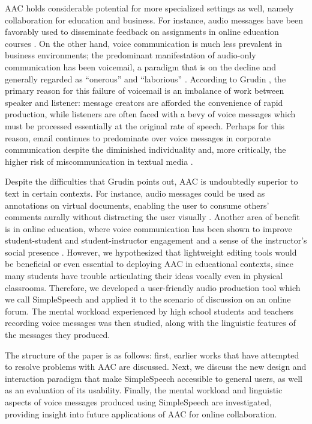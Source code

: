 \documentclass{sigchi}
\begin{document}
AAC holds considerable potential for more specialized settings as well, namely collaboration for education and business. 
For instance, audio messages have been favorably used to disseminate feedback on assignments in online education courses \cite{ice,oomen}. 
On the other hand, voice communication is much less prevalent in business environments; the predominant manifestation of audio-only communication has been voicemail, a paradigm that is on the decline and generally regarded as ``onerous'' and ``laborious'' \cite{whittaker}. 
According to Grudin \cite{grudin}, the primary reason for this failure of voicemail is an imbalance of work between speaker and listener: message creators are afforded the convenience of rapid production, while listeners are often faced with a bevy of voice messages which must be processed essentially at the original rate of speech. 
Perhaps for this reason, email continues to predominate over voice messages in corporate communication despite the diminished individuality and, more critically, the higher risk of miscommunication in textual media \cite{byron}.

Despite the difficulties that Grudin points out, AAC is undoubtedly superior to text in certain contexts. 
For instance, audio messages could be used as annotations on virtual documents, enabling the user to consume others' comments aurally without distracting the user visually \cite{yoon}.
Another area of benefit is in online education, where voice communication has been shown to improve student-student and student-instructor engagement and a sense of the instructor's social presence \cite{oomen,tu}. 
However, we hypothesized that lightweight editing tools would be beneficial or even essential to deploying AAC in educational contexts, since many students have trouble articulating their ideas vocally even in physical classrooms.
Therefore, we developed a user-friendly audio production tool which we call SimpleSpeech and applied it to the scenario of discussion on an online forum. 
The mental workload experienced by high school students and teachers recording voice messages was then studied, along with the linguistic features of the messages they produced.

The structure of the paper is as follows: first, earlier works that have attempted to resolve problems with AAC are discussed. 
Next, we discuss the new design and interaction paradigm that make SimpleSpeech accessible to general users, as well as an evaluation of its usability. 
Finally, the mental workload and linguistic aspects of voice messages produced using SimpleSpeech are investigated, providing insight into future applications of AAC for online collaboration.
\end{document}
